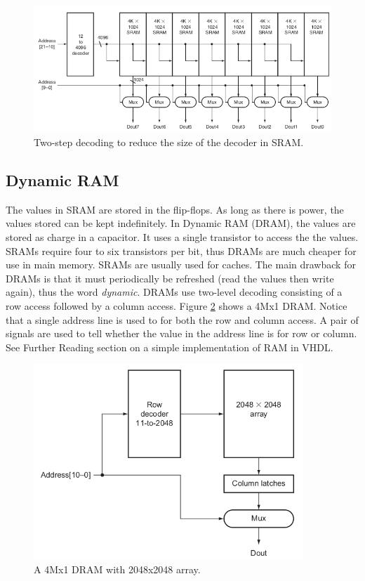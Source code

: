 \documentclass[a4paper, 11pt,oneside]{article}
\begin{document}
\begin{figure}[H]
	\begin{center}
	\includegraphics[width=5in]{sram2.png}
	\caption{Two-step decoding to reduce the size of the decoder in SRAM.}
	\label{fig:sram2} 
	\end{center}
\end{figure}

\subsection{Dynamic RAM}
The values in SRAM are stored in the flip-flops. As long as there is power, the
values stored can be kept indefinitely. In Dynamic RAM (DRAM), the values are 
stored as charge in a capacitor. It uses a single transistor to access the
the values. SRAMs require four to six transistors per bit, thus DRAMs are much 
cheaper for use in main memory. SRAMs are usually used for caches. The main 
drawback for DRAMs is that it must periodically be refreshed (read the 
values then write again), thus the word \textit{dynamic}. DRAMs use two-level 
decoding consisting of a row access followed by a column access.  
Figure \ref{fig:dram0} shows a 4Mx1 DRAM. Notice that a single  address line is
used to for both the row and column access. A pair of signals are used to tell 
whether the value in the address line is for row or column. See Further Reading
section on a simple implementation of RAM in VHDL.  

\begin{figure}[H]
	\begin{center}
	\includegraphics[width=4in]{dram0.png}
	\caption{A 4Mx1 DRAM with 2048x2048 array.}
	\label{fig:dram0} 
	\end{center}
\end{figure}
\end{document}
